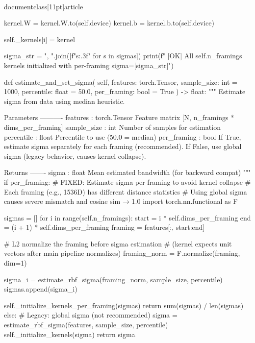 \\documentclass[11pt]{article}
\begin{document}
\begin{CodeBlock}
            kernel.W = kernel.W.to(self.device)
            kernel.b = kernel.b.to(self.device)

            self._kernels[i] = kernel

        sigma_str = ", ".join([f"{s:.3f}" for s in sigmas])
        print(f"  [OK] All {self.n_framings} kernels initialized with per-framing sigma=[{sigma_str}]")
    
    def estimate_and_set_sigma(
        self,
        features: torch.Tensor,
        sample_size: int = 1000,
        percentile: float = 50.0,
        per_framing: bool = True
    ) -> float:
        """
        Estimate sigma from data using median heuristic.

        Parameters
        ----------
        features : torch.Tensor
            Feature matrix [N, n_framings * dims_per_framing]
        sample_size : int
            Number of samples for estimation
        percentile : float
            Percentile to use (50.0 = median)
        per_framing : bool
            If True, estimate sigma separately for each framing (recommended).
            If False, use global sigma (legacy behavior, causes kernel collapse).

        Returns
        -------
        sigma : float
            Mean estimated bandwidth (for backward compat)
        """
        if per_framing:
            # FIXED: Estimate sigma per-framing to avoid kernel collapse
            # Each framing (e.g., 1536D) has different distance statistics
            # Using global sigma causes severe mismatch and cosine sim → 1.0
            import torch.nn.functional as F

            sigmas = []
            for i in range(self.n_framings):
                start = i * self.dims_per_framing
                end = (i + 1) * self.dims_per_framing
                framing = features[:, start:end]

                # L2 normalize the framing before sigma estimation
                # (kernel expects unit vectors after main pipeline normalizes)
                framing_norm = F.normalize(framing, dim=1)

                sigma_i = estimate_rbf_sigma(framing_norm, sample_size, percentile)
                sigmas.append(sigma_i)

            self._initialize_kernels_per_framing(sigmas)
            return sum(sigmas) / len(sigmas)
        else:
            # Legacy: global sigma (not recommended)
            sigma = estimate_rbf_sigma(features, sample_size, percentile)
            self._initialize_kernels(sigma)
            return sigma
    

\end{CodeBlock}
\end{document}
